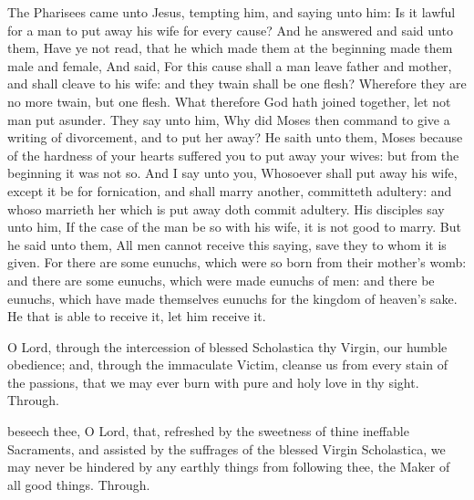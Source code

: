  The Pharisees came unto Jesus, tempting him, and saying unto him: Is it lawful for a man to put away his wife for every cause? And he answered and said unto them, Have ye not read, that he which made them at the beginning made them male and female, And said, For this cause shall a man leave father and mother, and shall cleave to his wife: and they twain shall be one flesh? Wherefore they are no more twain, but one flesh. What therefore God hath joined together, let not man put asunder. They say unto him, Why did Moses then command to give a writing of divorcement, and to put her away? He saith unto them, Moses because of the hardness of your hearts suffered you to put away your wives: but from the beginning it was not so. And I say unto you, Whosoever shall put away his wife, except it be for fornication, and shall marry another, committeth adultery: and whoso marrieth her which is put away doth commit adultery. His disciples say unto him, If the case of the man be so with his wife, it is not good to marry. But he said unto them, All men cannot receive this saying, save they to whom it is given. For there are some eunuchs, which were so born from their mother's womb: and there are some eunuchs, which were made eunuchs of men: and there be eunuchs, which have made themselves eunuchs for the kingdom of heaven's sake. He that is able to receive it, let him receive it.


\secret
{} O Lord, through the intercession of blessed Scholastica thy Virgin, our humble obedience; and, through the immaculate Victim, cleanse us from every stain of the passions, that we may ever burn with pure and holy love in thy sight. Through.


\postcommunion
{} beseech thee, O Lord, that, refreshed by the sweetness of thine ineffable Sacraments, and assisted by the suffrages of the blessed Virgin Scholastica, we may never be hindered by any earthly things from following thee, the Maker of all good things. Through.



